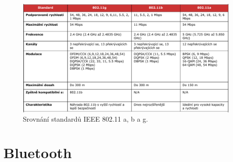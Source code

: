 \begin{figure}[H]
    \centering
    \includegraphics[width=1\linewidth]{802_11_abg.pdf}
    \caption{Srovnání standardů IEEE 802.11 a, b a g.}
\end{figure}


\section{Bluetooth}

